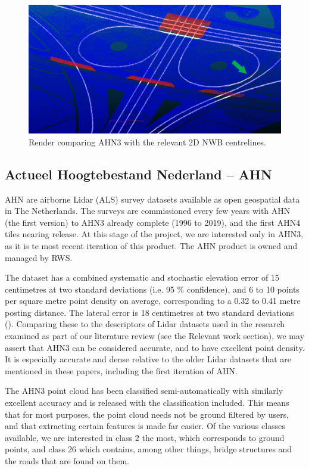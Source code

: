 \begin{figure}
    \centering
    \includegraphics[width=\linewidth]{final_report/figs/ahn_sample_04_a.png} 
    \caption{Render comparing AHN3 with the relevant 2D NWB centrelines.}
    \label{fig:ahnnwb}
\end{figure}

\subsection{Actueel Hoogtebestand Nederland – AHN}
\label{sub:ahn}

AHN are airborne Lidar (ALS) survey datasets available as open geospatial data in The Netherlands. The surveys are commissioned every few years with AHN (the first version) to AHN3 already complete (1996 to 2019), and the first AHN4 tiles nearing release. At this stage of the project, we are interested only in AHN3, as it is te most recent iteration of this product. The AHN product is owned and managed by RWS.

The dataset has a combined systematic and stochastic elevation error of 15 centimetres at two standard deviations (i.e. 95 \% confidence), and 6 to 10 points per square metre point density on average, corresponding to a 0.32 to 0.41 metre posting distance. The lateral error is 18 centimetres at two standard deviations (\cite{ahn_kwaliteit}). Comparing these to the descriptors of Lidar datasets used in the research examined as part of our literature review (see the Relevant work section), we may assert that AHN3 can be considered accurate, and to have excellent point density. It is especially accurate and dense relative to the older Lidar datasets that are mentioned in these papers, including the first iteration of AHN.

The AHN3 point cloud has been classified semi-automatically with similarly excellent accuracy and is released with the classification included. This means that for most purposes, the point cloud needs not be ground filtered by users, and that extracting certain features is made far easier. Of the various classes available, we are interested in class 2 the most, which corresponds to ground points, and class 26 which contains, among other things, bridge structures and the roads that are found on them.

